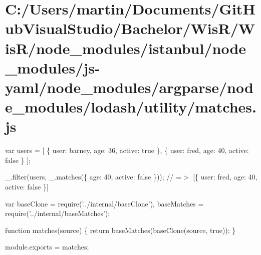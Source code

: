 \hypertarget{_c_1_2_users_2martin_2_documents_2_git_hub_visual_studio_2_bachelor_2_wis_r_2_wis_r_2node_moduleffff9e04ad5a6adbd4fe6408b03a9bd5}{}\section{C\+:/\+Users/martin/\+Documents/\+Git\+Hub\+Visual\+Studio/\+Bachelor/\+Wis\+R/\+Wis\+R/node\+\_\+modules/istanbul/node\+\_\+modules/js-\/yaml/node\+\_\+modules/argparse/node\+\_\+modules/lodash/utility/matches.\+js}
var users = \mbox{[} \{ \textquotesingle{}user\textquotesingle{}\+: \textquotesingle{}barney\textquotesingle{}, \textquotesingle{}age\textquotesingle{}\+: 36, \textquotesingle{}active\textquotesingle{}\+: true \}, \{ \textquotesingle{}user\textquotesingle{}\+: \textquotesingle{}fred\textquotesingle{}, \textquotesingle{}age\textquotesingle{}\+: 40, \textquotesingle{}active\textquotesingle{}\+: false \} \mbox{]};

\+\_\+.\+filter(users, \+\_\+.\+matches(\{ \textquotesingle{}age\textquotesingle{}\+: 40, \textquotesingle{}active\textquotesingle{}\+: false \})); // =$>$ \mbox{[}\{ \textquotesingle{}user\textquotesingle{}\+: \textquotesingle{}fred\textquotesingle{}, \textquotesingle{}age\textquotesingle{}\+: 40, \textquotesingle{}active\textquotesingle{}\+: false \}\mbox{]}


\begin{DoxyCodeInclude}
var baseClone = require(\textcolor{stringliteral}{'../internal/baseClone'}),
    baseMatches = require(\textcolor{stringliteral}{'../internal/baseMatches'});

\textcolor{keyword}{function} matches(source) \{
  \textcolor{keywordflow}{return} baseMatches(baseClone(source, \textcolor{keyword}{true}));
\}

module.exports = matches;
\end{DoxyCodeInclude}
 